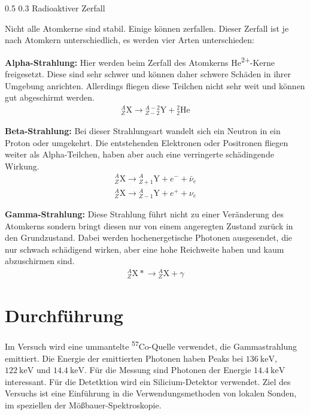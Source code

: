 \documentclass[german, %
parskip=full, %
bibliography=totoc, %
]{scrartcl}
\makeatletter
\renewcommand\subsection{\@startsection 
   {subsection}{2}{0mm}%
   {0.5\baselineskip}%
   {0.3\baselineskip}%
   {\bfseries\sffamily\large}%
   }
\makeatother
\begin{document}
\subsection{Radioaktiver Zerfall}

Nicht alle Atomkerne sind stabil. Einige können zerfallen. Dieser Zerfall ist je nach Atomkern unterschiedlich, es werden vier Arten unterschieden:

\textbf{Alpha-Strahlung:} Hier werden beim Zerfall des Atomkerns He\textsuperscript{2+}-Kerne freigesetzt. Diese sind sehr schwer und können daher schwere Schäden in ihrer Umgebung anrichten. Allerdings fliegen diese Teilchen nicht sehr weit und können gut abgeschirmt werden.
\begin{align}
{}^A_Z\mathrm{X} \to {}^{A-2}_{Z-2}\mathrm{Y} + {}^2_2\mathrm{He} \label{for:alpha}
\end{align}

\textbf{Beta-Strahlung:} Bei dieser Strahlungsart wandelt sich ein Neutron in ein Proton oder umgekehrt. Die entstehenden Elektronen oder Positronen fliegen weiter als Alpha-Teilchen, haben aber auch eine verringerte schädingende Wirkung.
\begin{align}
{}^A_Z\mathrm{X} \to {}^{A}_{Z+1}\mathrm{Y} + e^- + \bar \nu_e \\
{}^A_Z\mathrm{X} \to {}^{A}_{Z-1}\mathrm{Y} + e^+ + \nu_e \label{for:beta}
\end{align}

\textbf{Gamma-Strahlung:} Diese Strahlung führt nicht zu einer Veränderung des Atomkerns sondern bringt diesen nur von einem angeregten Zustand zurück in den Grundzustand. Dabei werden hochenergetische Photonen ausgesendet, die nur schwach schädigend wirken, aber eine hohe Reichweite haben und kaum abzuschirmen sind.
\begin{align}
{}^A_Z\mathrm{X*} \to {}^{A}_{Z}\mathrm{X} + \gamma \label{for:gamma}
\end{align}

\section{Durchführung}

Im Versuch wird eine ummantelte \textsuperscript{57}Co-Quelle verwendet, die Gammastrahlung emittiert. Die Energie der emittierten Photonen haben Peaks bei \(\SI{136}{\kilo\electronvolt}\), \(\SI{122}{\kilo\electronvolt}\) und \(\SI{14.4}{\kilo\electronvolt}\). Für die Messung sind Photonen der Energie \(\SI{14.4}{\kilo\electronvolt}\) interessant. Für die Detetktion wird ein Silicium-Detektor verwendet.
Ziel des Versuchs ist eine Einführung in die Verwendungsmethoden von lokalen Sonden, im speziellen der Mößbauer-Spektroskopie.
\end{document}
